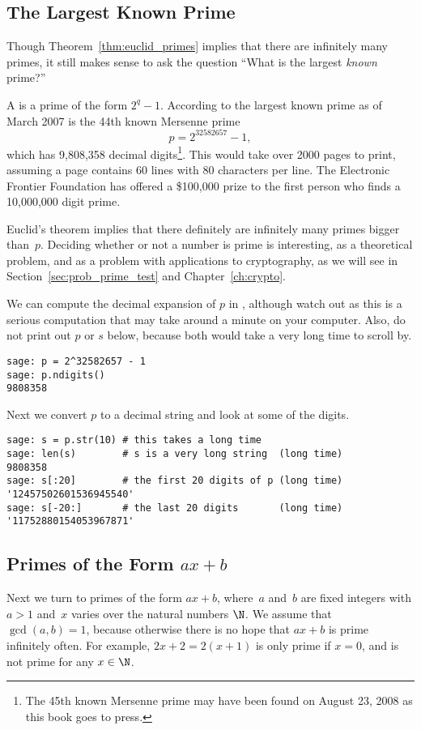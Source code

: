 \subsection{The Largest Known Prime}\label{sec:largest}
Though Theorem~\ref{thm:euclid_primes} implies that there are infinitely
many primes, it still makes sense to ask the question
``What is the largest {\em known} prime?''

A  is a prime of the form $2^q-1$.
According to \cite{caldwell:largestprime} the largest known prime
as of March 2007 is the 44th known Mersenne prime
$$
  p = 2^{32582657}-1,
$$
which has 9,808,358 decimal
digits\footnote{The 45th known Mersenne prime may
have been found on August 23, 2008 as this book goes to press.}.
This would take over 2000 pages to
print, assuming a page contains 60 lines with 80 characters per line.
The Electronic Frontier Foundation has offered a \$100,000 prize to
the first person who finds a 10,000,000 digit prime.

Euclid's theorem implies that there definitely are infinitely
many primes bigger than~$p$.
Deciding whether or not a number is prime is
interesting, as a theoretical problem,
and as a problem with
applications to cryptography, as we will see in
Section~\ref{sec:prob_prime_test} and Chapter~\ref{ch:crypto}.

\begin{sg}
We can compute the decimal expansion of $p$ in \sage, although
watch out as this is a serious computation that may take
around a minute on your computer.  Also, do not print
out $p$ or $s$ below, because both would take a very
long time to  scroll by.
\begin{verbatim}
sage: p = 2^32582657 - 1
sage: p.ndigits()
9808358
\end{verbatim}%
\noindent{}Next we convert $p$ to a decimal string and look at some of the digits.
\begin{verbatim}
sage: s = p.str(10) # this takes a long time
sage: len(s)        # s is a very long string  (long time)
9808358
sage: s[:20]        # the first 20 digits of p (long time)
'12457502601536945540'
sage: s[-20:]       # the last 20 digits       (long time)
'11752880154053967871'
\end{verbatim}
\end{sg}


\subsection{Primes of the Form $ax+b$}
Next we turn to primes of the form $ax+b$, where~$a$ and~$b$ are
fixed integers with $a>1$ and~$x$ varies over the natural numbers $\N$.
We assume that $\gcd(a,b)=1$, because otherwise there is no
hope that $ax+b$ is prime infinitely often.
For example, $2x+2=2(x+1)$ is only prime if $x=0$, and is
not prime for any $x\in\N$.

